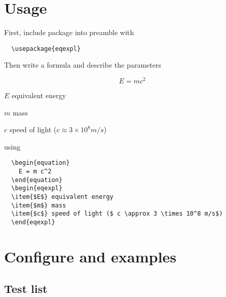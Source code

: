 \documentclass{article}
\begin{document}
\section{Usage}

First, include package into preamble with

\begin{verbatim}
  \usepackage{eqexpl}
\end{verbatim}

Then write a formula and describe the parameters

\begin{equation}
  E = m c^2
\end{equation}
\begin{eqexpl}
\item{$E$} equivalent energy
\item{$m$} mass
\item{$c$} speed of light ($ c \approx 3 \times 10^8 m/s$)
\end{eqexpl}
using
\begin{verbatim}
  \begin{equation}
    E = m c^2
  \end{equation}
  \begin{eqexpl}
  \item{$E$} equivalent energy
  \item{$m$} mass
  \item{$c$} speed of light ($ c \approx 3 \times 10^8 m/s$)
  \end{eqexpl}
\end{verbatim}

\section{Configure and examples}

\subsection{Test list}

\newcommand{\testList}{
\item{U} voltage at the section, V;
\item{Rs} total section resistance, Ohm.
\item{$Very^{46}$}very very very very very very very very very very very
  very very very very very very very very very very very very very
  very very very very very very very very very very very very very
  very very very very very very very very very long line;
}
\end{document}
